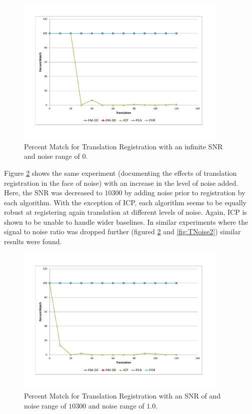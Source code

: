 \begin{figure}[!htb]
\centering
\includegraphics[width=4.0in]{images/results/noise/TransNoise0}
\caption{Percent Match for Translation Registration with an infinite SNR and noise range of $0$.}
\label{fig:TNoise0}
\end{figure}

Figure \ref{fig:TNoise1} shows the same experiment (documenting the effects of translation registration in the face of noise) with an increase in the level of noise added. Here, the SNR was decreased to $10300$ by adding noise prior to registration by each algorithm. With the exception of ICP, each algorithm seems to be equally robust at registering again translation at different levels of noise. Again, ICP is shown to be unable to handle wider baselines. In similar experiments where the signal to noise ratio was dropped further (figured \ref{fig:TNoise1} and \ref{fig:TNoise2}) similar results were found. \\


\begin{figure}[!htb]
\centering
\includegraphics[width=4.0in]{images/results/noise/TransNoise1}
\caption{Percent Match for Translation Registration with an SNR of and noise range of $10300$ and noise range of $1.0$.}
\label{fig:TNoise1}
\end{figure}


